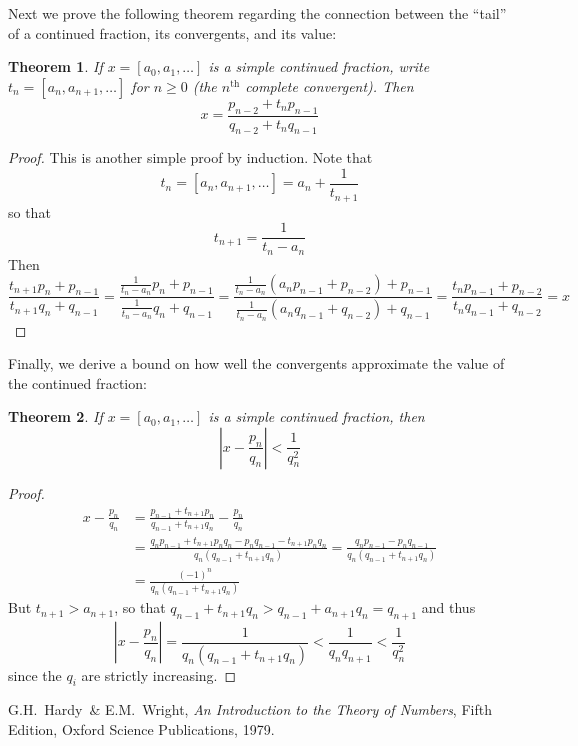 \documentclass[12pt]{article}
\newtheorem{thm}{Theorem}
\theoremstyle{definition}
\newcommand{\Abs}[1]{\left\lvert #1 \right\rvert}
\begin{document}
Next we prove the following theorem regarding the connection between the ``tail'' of a continued fraction, its convergents, and its value:
\begin{thm} If $x=[a_0,a_1,\ldots]$ is a simple continued fraction, write $t_n=[a_n,a_{n+1},\ldots]$ for $n\geq 0$ (the $n^{\mathrm{th}}$ \emph{complete convergent}). Then
\[x = \frac{p_{n-2}+t_np_{n-1}}{q_{n-2}+t_nq_{n-1}}\]
\end{thm}
\begin{proof} This is another simple proof by induction. Note that
\[t_n = [a_n,a_{n+1},\ldots] = a_n+\frac{1}{t_{n+1}}\]
so that
\[t_{n+1} = \frac{1}{t_n-a_n}\]
Then
\[
\frac{t_{n+1}p_n+p_{n-1}}{t_{n+1}q_n+q_{n-1}} = \frac{\frac{1}{t_n-a_n}p_n+p_{n-1}}{\frac{1}{t_n-a_n}q_n+q_{n-1}} = \frac{\frac{1}{t_n-a_n}(a_np_{n-1}+p_{n-2})+p_{n-1}}{\frac{1}{t_n-a_n}(a_nq_{n-1}+q_{n-2})+q_{n-1}}
= \frac{t_np_{n-1}+p_{n-2}}{t_nq_{n-1}+q_{n-2}} = x
\]
\end{proof}

Finally, we derive a bound on how well the convergents approximate the value of the continued fraction:
\begin{thm} If $x=[a_0,a_1,\ldots]$ is a simple continued fraction, then
\[\Abs{x-\frac{p_n}{q_n}} < \frac{1}{q_n^2}\]
\end{thm}
\begin{proof}
\begin{align*}
x-\frac{p_n}{q_n} &= \frac{p_{n-1}+t_{n+1}p_n}{q_{n-1}+t_{n+1}q_n}-\frac{p_n}{q_n} \\
&= \frac{q_np_{n-1}+t_{n+1}p_nq_n - p_nq_{n-1}-t_{n+1}p_nq_n}{q_n(q_{n-1}+t_{n+1}q_n)} = \frac{q_np_{n-1} - p_nq_{n-1}}{q_n(q_{n-1}+t_{n+1}q_n)}\\
&= \frac{(-1)^n}{q_n(q_{n-1}+t_{n+1}q_n)}
\end{align*}
But $t_{n+1}>a_{n+1}$, so that $q_{n-1}+t_{n+1}q_n > q_{n-1}+a_{n+1}q_n = q_{n+1}$ and thus
\[\Abs{x-\frac{p_n}{q_n}} = \frac{1}{q_n(q_{n-1}+t_{n+1}q_n)} < \frac{1}{q_nq_{n+1}} < \frac{1}{q_n^2}\]
since the $q_i$ are strictly increasing.
\end{proof}

\begin{thebibliography}{10}
G.H.~Hardy~\& E.M.~Wright, \emph{An Introduction to the Theory of Numbers}, Fifth Edition, Oxford Science Publications, 1979.
\end{thebibliography}
\end{document}
